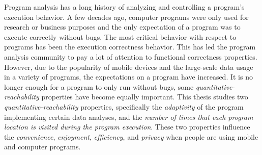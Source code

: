 Program analysis has a long history of analyzing and controlling a program's execution behavior.
A few decades ago, computer programs were only used for research or business purposes and the only expectation of a program was to execute correctly without bugs. 
The most critical behavior with respect to programs has been the execution correctness behavior. This has led the 
program analysis community to pay a lot of attention to functional correctness properties.
However, due to the popularity of mobile devices and the large-scale data usage in a variety of programs, the expectations on a program have increased. 
It is no longer enough for a program to only run without bugs,
some \emph{quantitative-reachability} properties 
have become equally important.
This thesis studies two \emph{quantitative-reachability} properties, specifically the \emph{adaptivity} of the program implementing certain data analyses,
and the \emph{number of times
that each program location is visited during the program execution}.
These two properties influence the \emph{convenience},
\emph{enjoyment}, \emph{efficiency}, and \emph{privacy}
when people are using mobile and computer programs.

